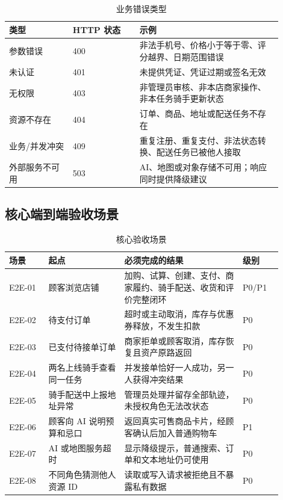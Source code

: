 \begin{longtable}{|L{0.21\linewidth}|L{0.22\linewidth}|L{0.47\linewidth}|}
\caption{业务错误类型}\label{tab:error-catalog}\\ \hline
\textbf{类型} & \textbf{HTTP 状态} & \textbf{示例} \\ \hline
参数错误 & 400 & 非法手机号、价格小于等于零、评分越界、日期范围错误 \\ \hline
未认证 & 401 & 未提供凭证、凭证过期或签名无效 \\ \hline
无权限 & 403 & 非管理员审核、非本店商家操作、非本任务骑手更新状态 \\ \hline
资源不存在 & 404 & 订单、商品、地址或配送任务不存在 \\ \hline
业务/并发冲突 & 409 & 重复注册、重复支付、非法状态转换、配送任务已被他人接取 \\ \hline
外部服务不可用 & 503 & AI、地图或对象存储不可用；响应同时提供降级建议 \\ \hline
\end{longtable}

\subsection{核心端到端验收场景}

\begin{longtable}{|L{0.13\linewidth}|L{0.25\linewidth}|L{0.39\linewidth}|L{0.13\linewidth}|}
\caption{核心验收场景}\label{tab:e2e-acceptance}\\ \hline
\textbf{场景} & \textbf{起点} & \textbf{必须完成的结果} & \textbf{级别} \\ \hline
E2E-01 & 顾客浏览店铺 & 加购、试算、创建、支付、商家履约、骑手配送、收货和评价完整闭环 & P0/P1 \\ \hline
E2E-02 & 待支付订单 & 超时或主动取消，库存与优惠券释放，不发生扣款 & P0 \\ \hline
E2E-03 & 已支付待接单订单 & 商家拒单或顾客取消，库存恢复且资产原路返回 & P0 \\ \hline
E2E-04 & 两名上线骑手查看同一任务 & 并发接单恰好一人成功，另一人获得冲突结果 & P0 \\ \hline
E2E-05 & 骑手配送中上报地址异常 & 管理员处理并留存全部轨迹，未授权角色无法改状态 & P0 \\ \hline
E2E-06 & 顾客向 AI 说明预算和忌口 & 返回真实可售商品卡片，经顾客确认后加入普通购物车 & P1 \\ \hline
E2E-07 & AI 或地图服务超时 & 显示降级提示，普通搜索、订单和文本地址仍可使用 & P0 \\ \hline
E2E-08 & 不同角色猜测他人资源 ID & 读取或写入请求被拒绝且不暴露私有数据 & P0 \\ \hline
\end{longtable}

